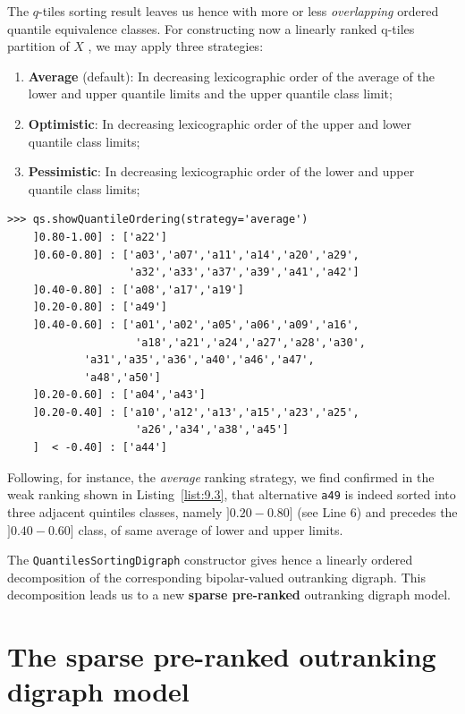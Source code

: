The $q$-tiles sorting result leaves us hence with more or less \emph{overlapping} ordered quantile equivalence classes. For constructing now a linearly ranked q-tiles partition of $X$ , we may apply three strategies:
\begin{enumerate}[leftmargin=0.5cm,rightmargin=0.5cm,topsep=1pt]
\item \textbf{Average} (default): In decreasing lexicographic order of the average of the lower and upper quantile limits and the upper quantile class limit;
\item \textbf{Optimistic}: In decreasing lexicographic order of the upper and lower quantile class limits;
\item \textbf{Pessimistic}: In decreasing lexicographic order of the lower and upper quantile class limits;
\end{enumerate}

\begin{lstlisting}[caption={Weakly ranking the quintiles sorting result},label=list:9.3]
>>> qs.showQuantileOrdering(strategy='average')
    ]0.80-1.00] : ['a22']
    ]0.60-0.80] : ['a03','a07','a11','a14','a20','a29',
                   'a32','a33','a37','a39','a41','a42']
    ]0.40-0.80] : ['a08','a17','a19']
    ]0.20-0.80] : ['a49']
    ]0.40-0.60] : ['a01','a02','a05','a06','a09','a16',
                    'a18','a21','a24','a27','a28','a30',
		    'a31','a35','a36','a40','a46','a47',
		    'a48','a50']
    ]0.20-0.60] : ['a04','a43']
    ]0.20-0.40] : ['a10','a12','a13','a15','a23','a25',
                    'a26','a34','a38','a45']
    ]  < -0.40] : ['a44']
\end{lstlisting}
Following, for instance, the \emph{average} ranking strategy, we find confirmed in the weak ranking shown in Listing~\vref{list:9.3},  that alternative \texttt{a49}  is indeed sorted into three adjacent quintiles classes, namely $]0.20-0.80]$ (see Line 6) and precedes the $]0.40-0.60]$ class, of same average of lower and upper limits.

The \texttt{QuantilesSortingDigraph} constructor gives hence a linearly ordered decomposition of the corresponding bipolar-valued outranking digraph. This decomposition leads us to a new \textbf{sparse pre-ranked} outranking digraph model.

\section{The sparse pre-ranked outranking digraph model}
\label{sec:9.3}

